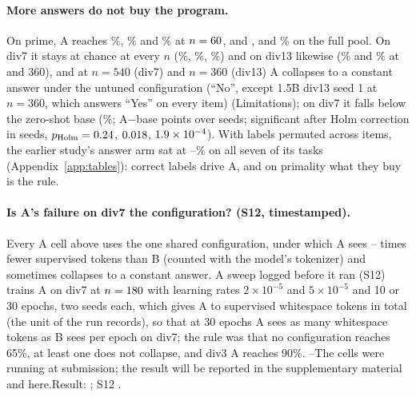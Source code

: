 \documentclass{article}
\theoremstyle{definition}
\def\NRToken{--}\def\PendingToken{pending}   %
\begin{document}
\paragraph{More answers do not buy the program.} On prime, A reaches \primeAsmall\%, \primeA\% and \primeAlarge\% at $n=60$, \nTrain{} and \nTrainLarge{}, and \primeAtok\% on the full pool. On div7 it stays at chance at every $n$ (\divsevenAnSixty\%, \divsevenAnOneEighty\%, \divsevenAnFiveForty\%) and on div13 likewise (\divthirteenAnOneEighty\% and \divthirteenAnThreeSixty\% at \nTrain{} and 360), and at $n=540$ (div7) and $n=360$ (div13) A collapses to a constant answer under the untuned configuration (``No'', except 1.5B div13 seed 1 at $n=360$, which answers ``Yes'' on every item) (Limitations); on div7 it falls below the zero-shot base (\divsevenBase\%; A$-$base \divsevenBootABaseDiff{} \divsevenBootABaseCi{} points over \divsevenBootABaseSeeds{} seeds; significant after Holm correction in \divsevenABaseHolmSig{} seeds, $p_{\mathrm{Holm}}=0.24$, $0.018$, $1.9\times 10^{-4}$). With labels permuted across items, the earlier study's answer arm sat at \shufMin--\shufMax\% on all seven of its tasks (Appendix~\ref{app:tables}): correct labels drive A, and on primality what they buy is the rule.

\paragraph{Is A's failure on div7 the configuration? (S12, timestamped).} Every A cell above uses the one shared configuration, under which A sees \tokRatioLow--\tokRatioHigh{} times fewer supervised tokens than B (counted with the model's tokenizer) and sometimes collapses to a constant answer. A sweep logged before it ran (S12) trains A on div7 at $n=180$ with learning rates $2\times10^{-5}$ and $5\times10^{-5}$ and 10 or 30 epochs, two seeds each, which gives A \sweepAlrTwoEpTenTok{} to \sweepAlrFiveEpThirtyTok{} supervised whitespace tokens in total (the unit of the run records), so that at 30 epochs A sees as many whitespace tokens as B sees per epoch on div7; the rule was that no configuration reaches 65\%, at least one does not collapse, and div3 A reaches 90\%. \ifx\sweepAmax\NRToken The cells were running at submission; the result will be reported in the supplementary material and here.\else Result: \STwelveResult; S12 \STwelveVerdict.\fi
\end{document}
